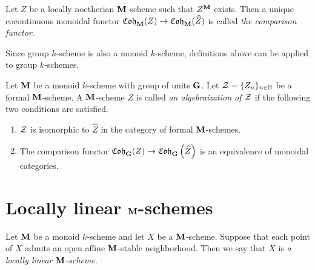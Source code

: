 \begin{definition}
Let $Z$ be a locally noetherian $\mathbf{M}$-scheme such that $Z^{\mathbf{M}}$ exists. Then a unique cocontinuous monoidal functor $\mathfrak{Coh}_{\mathbf{M}}(Z)\rightarrow \mathfrak{Coh}_{\mathbf{M}}(\widehat{Z})$ is called \textit{the comparison functor}.
\end{definition}
\noindent
Since group $k$-scheme is also a monoid $k$-scheme, definitions above can be applied to group $k$-schemes.

\begin{definition}
Let $\mathbf{M}$ be a monoid $k$-scheme with group of units $\mathbf{G}$. Let ${\mathcal Z} = \{Z_n\}_{n\in \mathbb{N}}$ be a formal $\mathbf{M}$-scheme. A $\mathbf{M}$-scheme $Z$ is called \textit{an algebraization of ${\mathcal Z}$} if the following two conditions are satisfied.
\begin{enumerate}[label=\textbf{(\arabic*)}, leftmargin=3.0em]
\item ${\mathcal Z}$ is isomorphic to $\widehat{Z}$ in the category of formal $\mathbf{M}$-schemes.
\item The comparison functor $\mathfrak{Coh}_{\mathbf{G}}(Z)\rightarrow \mathfrak{Coh}_{\mathbf{G}}\left(\widehat{Z}\right)$ is an equivalence of monoidal categories.
\end{enumerate}
\end{definition}

\section{Locally linear $\mathbf{M}$-schemes}

\begin{definition}
Let $\mathbf{M}$ be a monoid $k$-scheme and let $X$ be a $\mathbf{M}$-scheme. Suppose that each point of $X$ admits an open affine $\mathbf{M}$-stable neighborhood. Then we say that $X$ is \textit{a locally linear $\mathbf{M}$-scheme}.
\end{definition}

